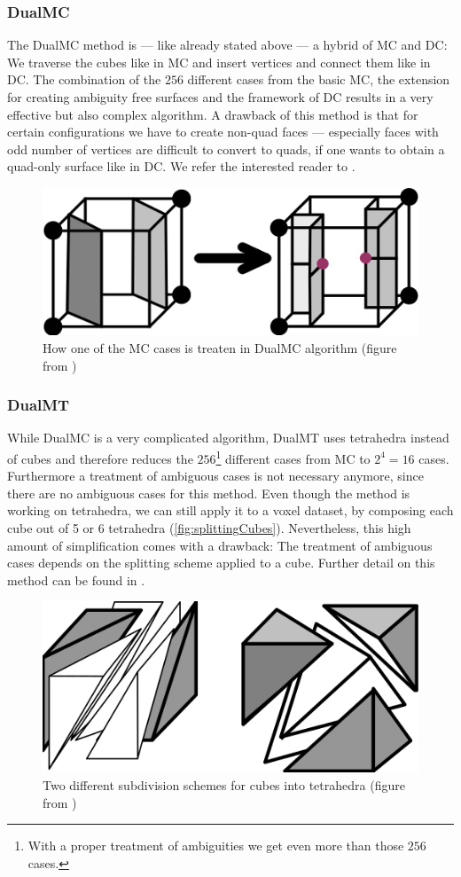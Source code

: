 \subsubsection{\acl{DualMC}}
The \acf{DualMC} method is --- like already stated above --- a hybrid of \ac{MC} and \ac{DC}: We traverse the cubes like in \ac{MC} and insert vertices and connect them like in \ac{DC}. The combination of the $256$ different cases from the basic \ac{MC}, the extension for creating ambiguity free surfaces and the framework of \ac{DC} results in a very effective but also complex algorithm. A drawback of this method is that for certain configurations we have to create non-\ac{quad} faces --- especially faces with odd number of vertices are difficult to convert to \acp{quad}, if one wants to obtain a \ac{quad}-only surface like in \ac{DC}. We refer the interested reader to  \cite{Nielson2004, Zhang2012}.

\begin{figure}
\begin{center}
\includegraphics[width = .5\textwidth]{Pictures/SurfaceReconstruction/MCtoDualMC.png}
\end{center}
\caption{How one of the \ac{MC} cases is treaten in \ac{DualMC} algorithm (figure from \cite{Nielson2004})}
\end{figure}

\subsubsection{\acl{DualMT}}
While \ac{DualMC} is a very complicated algorithm, \acf{DualMT} uses tetrahedra instead of cubes and therefore reduces the $256$\footnote{With a proper treatment of ambiguities we get even more than those $256$ cases.} different cases from \ac{MC} to $2^4=16$ cases. Furthermore a treatment of ambiguous cases is not necessary anymore, since there are no ambiguous cases for this method.
Even though the method is working on tetrahedra, we can still apply it to a voxel dataset, by composing each cube out of 5 or 6 tetrahedra (\autoref{fig:splittingCubes}). Nevertheless, this high amount of simplification comes with a drawback: The treatment of ambiguous cases depends on the splitting scheme applied to a cube. Further detail on this method can be found in \cite{Nielson2008}.

\begin{figure}
\begin{center}
\includegraphics[width = .5 \textwidth]{Pictures/SurfaceReconstruction/SplittingCubes.png}
\caption{Two different subdivision schemes for cubes into tetrahedra (figure from \cite{Nielson2008})}
\label{fig:splittingCubes}
\end{center}
\end{figure}
